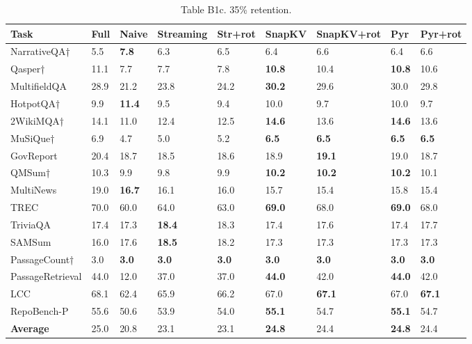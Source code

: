 \documentclass[10pt,letterpaper]{article}
\begin{document}
\begin{table}[H]
\centering
\small
\caption*{Table B1c. 35\% retention.}
\begin{tabular}{@{}lllllllll@{}}
\toprule
Task & Full & Naive & Streaming & Str+rot & SnapKV & SnapKV+rot & Pyr &
Pyr+rot\\
\midrule
    NarrativeQA† & 5.5 & \textbf{7.8} & 6.3 & 6.5 & 6.4 & 6.6 & 6.4 & 6.6\\
    Qasper† & 11.1 & 7.7 & 7.7 & 7.8 & \textbf{10.8} & 10.4 & \textbf{10.8} & 10.6\\
    MultifieldQA & 28.9 & 21.2 & 23.8 & 24.2 & \textbf{30.2} & 29.6 & 30.0 & 29.8\\
    HotpotQA† & 9.9 & \textbf{11.4} & 9.5 & 9.4 & 10.0 & 9.7 & 10.0 & 9.7\\
    2WikiMQA† & 14.1 & 11.0 & 12.4 & 12.5 & \textbf{14.6} & 13.6 & \textbf{14.6} & 13.6\\
    MuSiQue† & 6.9 & 4.7 & 5.0 & 5.2 & \textbf{6.5} & \textbf{6.5} & \textbf{6.5} & \textbf{6.5}\\
    GovReport & 20.4 & 18.7 & 18.5 & 18.6 & 18.9 & \textbf{19.1} & 19.0 & 18.7\\
    QMSum† & 10.3 & 9.9 & 9.8 & 9.9 & \textbf{10.2} & \textbf{10.2} & \textbf{10.2} & 10.1\\
    MultiNews & 19.0 & \textbf{16.7} & 16.1 & 16.0 & 15.7 & 15.4 & 15.8 & 15.4\\
    TREC & 70.0 & 60.0 & 64.0 & 63.0 & \textbf{69.0} & 68.0 & \textbf{69.0} & 68.0\\
    TriviaQA & 17.4 & 17.3 & \textbf{18.4} & 18.3 & 17.4 & 17.6 & 17.4 & 17.7\\
    SAMSum & 16.0 & 17.6 & \textbf{18.5} & 18.2 & 17.3 & 17.3 & 17.3 & 17.3\\
    PassageCount† & 3.0 & \textbf{3.0} & \textbf{3.0} & \textbf{3.0} & \textbf{3.0} & \textbf{3.0} & \textbf{3.0} & \textbf{3.0}\\
    PassageRetrieval & 44.0 & 12.0 & 37.0 & 37.0 & \textbf{44.0} & 42.0 & \textbf{44.0} & 42.0\\
    LCC & 68.1 & 62.4 & 65.9 & 66.2 & 67.0 & \textbf{67.1} & 67.0 & \textbf{67.1}\\
    RepoBench-P & 55.6 & 50.6 & 53.9 & 54.0 & \textbf{55.1} & 54.7 & \textbf{55.1} & 54.7\\
    \textbf{Average} & 25.0 & 20.8 & 23.1 & 23.1 & \textbf{24.8} & 24.4 & \textbf{24.8} & 24.4\\
\bottomrule
\end{tabular}
\end{table}
\end{document}
